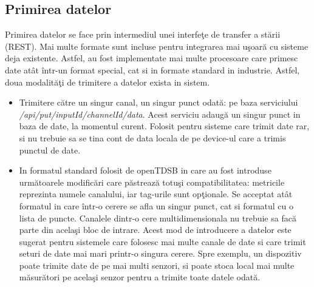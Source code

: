 \subsection{Primirea datelor}
Primirea datelor se face prin intermediul unei interfeţe de transfer a stării (REST). Mai multe formate sunt incluse pentru integrarea mai uşoară cu sisteme deja existente. Astfel, au fost implementate mai multe procesoare care primesc date atât într-un format special, cat si in formate standard in industrie.
Astfel, doua modalităţi de trimitere a datelor exista in sistem.
\begin{itemize}
	\item Trimitere către un singur canal, un singur punct odată: pe baza serviciului\\ \textit{/api/put/{inputId}/{channelId}/{data}}. Acest serviciu adaugă un singur punct in baza de date, la momentul curent. Folosit pentru sisteme care trimit date rar, si nu trebuie sa se tina cont de data locala de pe device-ul care a trimis punctul de date.
	\item In formatul standard folosit de openTDSB in care au fost introduse următoarele modificări care păstrează totuşi compatibilitatea: metricile reprezinta numele canalului, iar tag-urile sunt opţionale. Se acceptat atât formatul in care într-o cerere se afla un singur punct, cat si formatul cu o lista de puncte. Canalele dintr-o cere multidimensionala nu trebuie sa facă parte din acelaşi bloc de intrare. Acest mod de introducere a datelor este sugerat pentru sistemele care folosesc mai multe canale de date si care trimit seturi de date mai mari printr-o singura cerere. Spre exemplu, un dispozitiv poate trimite date de pe mai multi senzori, si poate stoca local mai multe măsurători pe acelaşi senzor pentru a trimite toate datele odată.
\end{itemize}
